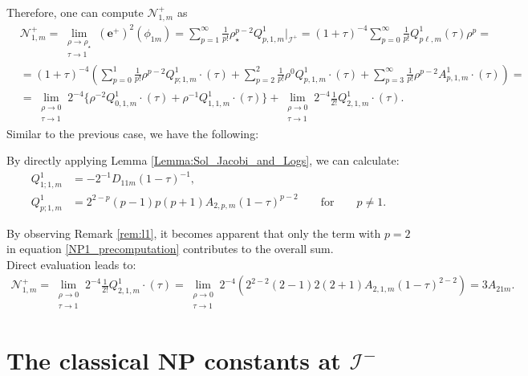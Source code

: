 Therefore, one can compute $\mathcal{N}^{+}_{1,m}$ as
\begin{align}\label{NP1_precomputation}
  & \mathcal{N}^{+}_{1,m}= \lim_{\substack{\rho \to \rho_{\star} \\ \tau \to 1}} (\boldsymbol{e}^{+})^2(\phi_{1m}) = \sum_{p=1}^{\infty}\frac{1}{p!}\rho_{\star}^{p-2}Q^{1}_{p,1,m}|_{\mathscr{I}^{+}} =  (1+\tau)^{-4} \sum_{p=0}^{\infty} \frac{1}{p !} Q_{p \ell, m}^{1}(\tau) \rho^{p} = \nonumber \\
  & = (1+\tau)^{-4}\left(\sum_{p=0}^{1} \frac{1}{p !} \rho^{p-2} Q_{p; 1, m}^{1}\cdot(\tau)+\sum_{p=2}^{2} \frac{1}{p !} \rho^{0} Q_{p, 1, m}^{1}\cdot(\tau)+\sum_{p=3}^{\infty} \frac{1}{p !} \rho^{p-2} A_{p, 1, m}^{1}\cdot{(\tau)}\right) = \nonumber \\
  & = \lim _{\substack{\rho \rightarrow 0 \\ \tau \rightarrow 1}} 2^{-4}\big\{\rho^{-2} Q_{0,1, m}^{1}\cdot(\tau)+\rho^{-1} Q_{1,1, m}^{1}\cdot(\tau)\big\}+\lim_{\substack{\rho \rightarrow 0 \\ \tau \rightarrow 1}} 2^{-4} \frac{1}{2 !} Q^{1}_{2, 1, m}\cdot(\tau). 
\end{align}
Similar to the previous case, we have the following:
\begin{remark}\label{rem:l1}
  By directly applying Lemma \ref{Lemma:Sol_Jacobi_and_Logs}, we can calculate: 
 \begin{align}
   Q^{1}_{1;1,m} &=-2^{-1}D_{11m}(1-\tau)^{-1},\\
   Q^{1}_{p;1,m} &=2^{2-p}(p-1)p(p+1)A_{2,p,m}(1-\tau)^{p-2} \qquad
   \text{for}\qquad p\neq 1.
 \end{align}
\end{remark}
\pagebreak
By observing Remark \ref{rem:l1}, it becomes apparent that only the term with $p=2$ in equation \eqref{NP1_precomputation} contributes to the overall sum. \\
Direct evaluation leads to:
\begin{align}
  \mathcal{N}^{+}_{1,m} = \lim _{\substack{\rho \rightarrow 0 \\ \tau \rightarrow 1}}2^{-4} \frac{1}{2 !} Q^{1}_{2, 1, m}\cdot(\tau) = \lim _{\substack{\rho \rightarrow 0 \\ \tau \rightarrow 1}}2^{-4}\left(2^{2-2}(2-1)2(2+1)A_{2,1,m}(1-\tau)^{2-2}\right) = 3A_{21m}.
\end{align}
\section{The classical NP constants at $\mathscr{I}^{-}$}
\label{sec:classicalNPminus}

